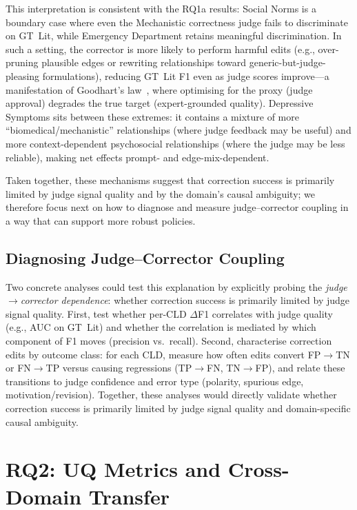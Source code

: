 This interpretation is consistent with the RQ1a results: Social Norms is a boundary case where even the Mechanistic correctness judge fails to discriminate on GT~Lit, while Emergency Department retains meaningful discrimination. In such a setting, the corrector is more likely to perform harmful edits (e.g., over-pruning plausible edges or rewriting relationships toward generic-but-judge-pleasing formulations), reducing GT~Lit F1 even as judge scores improve---a manifestation of Goodhart's law~\citep{goodhart1984problems}, where optimising for the proxy (judge approval) degrades the true target (expert-grounded quality). Depressive Symptoms sits between these extremes: it contains a mixture of more ``biomedical/mechanistic'' relationships (where judge feedback may be useful) and more context-dependent psychosocial relationships (where the judge may be less reliable), making net effects prompt- and edge-mix-dependent.

Taken together, these mechanisms suggest that correction success is primarily limited by judge signal quality and by the domain's causal ambiguity; we therefore focus next on how to diagnose and measure judge--corrector coupling in a way that can support more robust policies.

\subsection{Diagnosing Judge--Corrector Coupling}

Two concrete analyses could test this explanation by explicitly probing the \emph{judge$\rightarrow$corrector dependence}: whether correction success is primarily limited by judge signal quality. First, test whether per-CLD $\Delta$F1 correlates with judge quality (e.g., AUC on GT~Lit) and whether the correlation is mediated by which component of F1 moves (precision vs.\ recall). Second, characterise correction edits by outcome class: for each CLD, measure how often edits convert FP$\rightarrow$TN or FN$\rightarrow$TP versus causing regressions (TP$\rightarrow$FN, TN$\rightarrow$FP), and relate these transitions to judge confidence and error type (polarity, spurious edge, motivation/revision). Together, these analyses would directly validate whether correction success is primarily limited by judge signal quality and domain-specific causal ambiguity.

\section{RQ2: UQ Metrics and Cross-Domain Transfer}
\label{sec:discussion_rq2}

